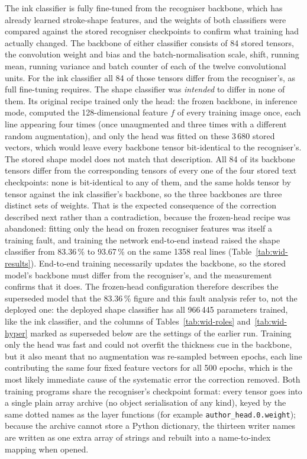 The ink classifier is fully fine-tuned from the recogniser backbone, which has already learned stroke-shape features, and the weights of both classifiers were compared against the stored recogniser checkpoints to confirm what training had actually changed.
The backbone of either classifier consists of 84 stored tensors, the convolution weight and bias and the batch-normalisation scale, shift, running mean, running variance and batch counter of each of the twelve convolutional units.
For the ink classifier all 84 of those tensors differ from the recogniser's, as full fine-tuning requires.
The shape classifier was \emph{intended} to differ in none of them.
Its original recipe trained only the head: the frozen backbone, in inference mode, computed the 128-dimensional feature $f$ of every training image once, each line appearing four times (once unaugmented and three times with a different random augmentation), and only the head was fitted on these 3\,680 stored vectors, which would leave every backbone tensor bit-identical to the recogniser's.
The stored shape model does not match that description.
All 84 of its backbone tensors differ from the corresponding tensors of every one of the four stored text checkpoints: none is bit-identical to any of them, and the same holds tensor by tensor against the ink classifier's backbone, so the three backbones are three distinct sets of weights.
That is the expected consequence of the correction described next rather than a contradiction, because the frozen-head recipe was abandoned: fitting only the head on frozen recogniser features was itself a training fault, and training the network end-to-end instead raised the shape classifier from 83.36\,\% to 93.67\,\% on the same 1358 real lines (Table~\ref{tab:wid-results}).
End-to-end training necessarily updates the backbone, so the stored model's backbone must differ from the recogniser's, and the measurement confirms that it does.
The frozen-head configuration therefore describes the superseded model that the 83.36\,\% figure and this fault analysis refer to, not the deployed one: the deployed shape classifier has all 966\,445 parameters trained, like the ink classifier, and the columns of Tables~\ref{tab:wid-roles} and~\ref{tab:wid-hyper} marked as superseded below are the settings of the earlier run.
Training only the head was fast and could not overfit the thickness cue in the backbone, but it also meant that no augmentation was re-sampled between epochs, each line contributing the same four fixed feature vectors for all 500 epochs, which is the most likely immediate cause of the systematic error the correction removed.
Both training programs share the recogniser's checkpoint format: every tensor goes into a single plain array archive (no object serialisation of any kind), keyed by the same dotted names as the layer functions (for example \texttt{author\_head.0.weight}); because the archive cannot store a Python dictionary, the thirteen writer names are written as one extra array of strings and rebuilt into a name-to-index mapping when opened.

